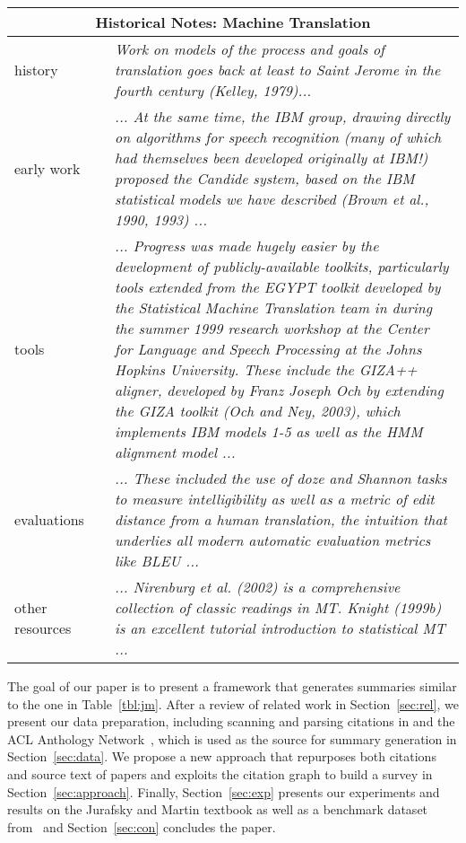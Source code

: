 \begin{table*}
\centering
{\scriptsize
\begin{tabular}{p{1cm}cp{14cm}} \hline
\multicolumn{3}{c}{{\bf Historical Notes: Machine Translation}}\\ \hline
history & & {\it Work on models of the process and goals of translation goes back at least to Saint Jerome in the fourth century (Kelley, 1979)...}\\ [1.5ex]
early work & & {\it ... At the same time, the IBM group, drawing directly on algorithms for speech recognition (many of which had themselves been developed originally at IBM!) proposed the Candide system, based on the IBM statistical models we have described (Brown et al., 1990, 1993) ...}\\ [1.5ex]
tools & & {\it ... Progress was made hugely easier by the development of publicly-available toolkits, particularly tools extended from  the EGYPT toolkit developed by the Statistical Machine Translation team in during the summer 1999 research workshop at the Center for Language and Speech Processing at the Johns Hopkins University. These include the GIZA++ aligner, developed by Franz Joseph Och by extending the GIZA toolkit (Och and Ney, 2003), which implements IBM models 1-5 as well as the HMM alignment model ...} \\ [1.5ex]
evaluations & & {\it ... These included the use of doze and Shannon tasks to measure intelligibility as well as a metric of edit distance from a human translation, the intuition that underlies all modern automatic evaluation metrics like BLEU ...}\\ [1.5ex]
other resources & & {\it ... Nirenburg et al. (2002) is a comprehensive collection of classic readings in MT. Knight (1999b) is an excellent tutorial introduction to statistical MT ...}\\ \hline
\end{tabular}}
\caption{Part of the historical note in ~\cite{JurafskyM08} signifying the history, early and late developments and evaluation in ``machine translation''}\label{tbl:jm}
\end{table*}

The goal of our paper is to present a framework that generates
summaries similar to the one in Table~\ref{tbl:jm}. After a review of
related work in Section~\ref{sec:rel}, we present our data
preparation, including scanning and parsing citations in
\cite{JurafskyM08} and the ACL Anthology Network~\cite{radev&al2009},
which is used as the source for summary generation in
Section~\ref{sec:data}. We propose a new approach that repurposes both
citations and source text of papers and exploits the citation graph to
build a survey in Section~\ref{sec:approach}. Finally,
Section~\ref{sec:exp} presents our experiments and results on the
Jurafsky and Martin textbook as well as a benchmark dataset from~\cite{mohammad-EtAl:2009:NAACLHLT09} and Section~\ref{sec:con} concludes the paper.
